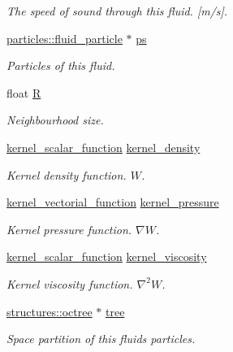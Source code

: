 \begin{DoxyCompactItemize}
\begin{DoxyCompactList}\small\item\em The speed of sound through this fluid. \mbox{[}m/s\mbox{]}. \end{DoxyCompactList}\item 
\mbox{\label{classphysim_1_1fluids_1_1fluid_a84c7e50ce0c4f26f1358527f84a18dbb}} 
\hyperlink{classphysim_1_1particles_1_1fluid__particle}{particles\+::fluid\+\_\+particle} $\ast$ \hyperlink{classphysim_1_1fluids_1_1fluid_a84c7e50ce0c4f26f1358527f84a18dbb}{ps}
\begin{DoxyCompactList}\small\item\em Particles of this fluid. \end{DoxyCompactList}\item 
\mbox{\label{classphysim_1_1fluids_1_1fluid_a21f8c90be97f04d991adb05a8a088cf7}} 
float \hyperlink{classphysim_1_1fluids_1_1fluid_a21f8c90be97f04d991adb05a8a088cf7}{R}
\begin{DoxyCompactList}\small\item\em Neighbourhood size. \end{DoxyCompactList}\item 
\hyperlink{namespacephysim_1_1fluids_a22c55c76ab3fe3de79dada15e2f9c2d6}{kernel\+\_\+scalar\+\_\+function} \hyperlink{classphysim_1_1fluids_1_1fluid_a8774f815e80bb81ddc14890fee13bffc}{kernel\+\_\+density}
\begin{DoxyCompactList}\small\item\em Kernel density function. $W$. \end{DoxyCompactList}\item 
\hyperlink{namespacephysim_1_1fluids_ab109a55050c62abe9c1c23924f620754}{kernel\+\_\+vectorial\+\_\+function} \hyperlink{classphysim_1_1fluids_1_1fluid_ae3ccfb94b27e6a1464210d36744f16a4}{kernel\+\_\+pressure}
\begin{DoxyCompactList}\small\item\em Kernel pressure function. $\nabla W$. \end{DoxyCompactList}\item 
\hyperlink{namespacephysim_1_1fluids_a22c55c76ab3fe3de79dada15e2f9c2d6}{kernel\+\_\+scalar\+\_\+function} \hyperlink{classphysim_1_1fluids_1_1fluid_a5ba8b8fc47ed8c45c279aebf5d62899d}{kernel\+\_\+viscosity}
\begin{DoxyCompactList}\small\item\em Kernel viscosity function. $\nabla^2 W$. \end{DoxyCompactList}\item 
\hyperlink{classphysim_1_1structures_1_1octree}{structures\+::octree} $\ast$ \hyperlink{classphysim_1_1fluids_1_1fluid_a9728c3603981a5a4658a263b900c1c3c}{tree}
\begin{DoxyCompactList}\small\item\em Space partition of this fluid\textquotesingle{}s particles. \end{DoxyCompactList}\end{DoxyCompactItemize}



